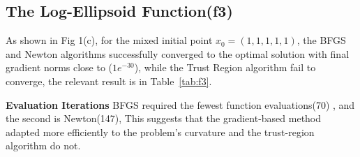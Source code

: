 \documentclass[12pt]{article}
\begin{document}
\subsection{The Log-Ellipsoid Function(f3)}
As shown in Fig 1(c),  for the mixed initial point $x_0 = (1, 1,1 ,1, 1)$, the BFGS and Newton algorithms successfully  converged to the optimal solution with final gradient norms close to ($1e^{-30}$), while the Trust Region algorithm fail to converge, the relevant result is in Table~\ref{tab:f3}.

\textbf{Evaluation Iterations}  BFGS required the fewest function evaluations(70) , and the second is Newton(147),  This suggests that the gradient-based method adapted more efficiently to the problem’s
curvature and the trust-region algorithm do not.

\begin{table}[h]
    \centering
    \caption{Optimization results for the Log-Ellipsoid Function.}
    \label{tab:f3}
\end{table}
\end{document}
